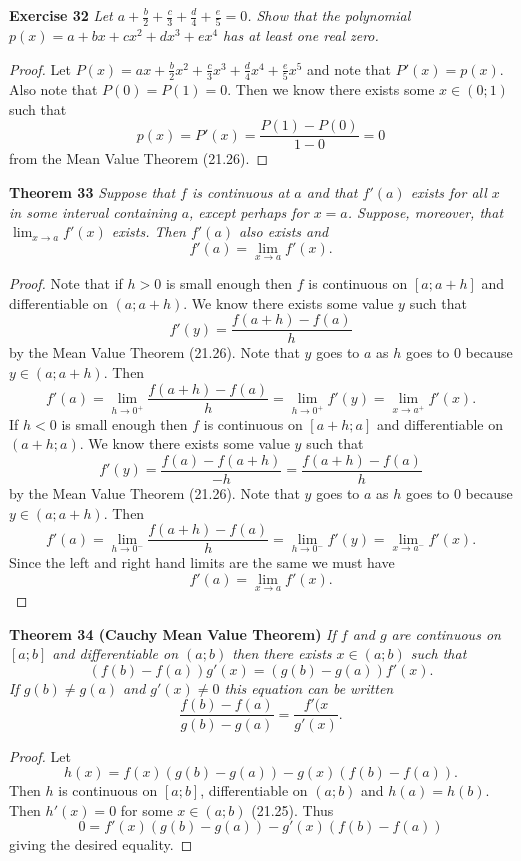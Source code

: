 \documentclass{article}
\begin{document}
\begin{flushleft}
\textbf{Exercise 32}
\textsl{Let $a + \frac{b}{2} + \frac{c}{3} + \frac{d}{4} + \frac{e}{5} = 0$. Show that the polynomial $p(x) = a + bx + cx^2 + dx^3 + ex^4$ has at least one real zero.}
\begin{proof}
Let $P(x) = ax + \frac{b}{2}x^2 + \frac{c}{3}x^3 + \frac{d}{4}x^4 + \frac{e}{5}x^5$ and note that $P'(x) = p(x)$. Also note that $P(0) = P(1) = 0$. Then we know there exists some $x \in (0;1)$ such that
\[
p(x) = P'(x) = \frac{P(1) - P(0)}{1-0} = 0
\]
from the Mean Value Theorem (21.26).
\end{proof}

\textbf{Theorem 33}
\textsl{Suppose that $f$ is continuous at $a$ and that $f'(a)$ exists for all $x$ in some interval containing $a$, except perhaps for $x = a$. Suppose, moreover, that $\lim_{x \rightarrow a} f'(x)$ exists. Then $f'(a)$ also exists and
\[
f'(a) = \lim_{x \rightarrow a} f'(x).
\]}
\begin{proof}
Note that if $h > 0$ is small enough then $f$ is continuous on $[a; a+h]$ and differentiable on $(a;a+h)$. We know there exists some value $y$ such that
\[
f'(y) = \frac{f(a+h) - f(a)}{h}
\]
by the Mean Value Theorem (21.26). Note that $y$ goes to $a$ as $h$ goes to $0$ because $y \in (a; a+h)$. Then
\[
f'(a) = \lim_{h \rightarrow 0^+} \frac{f(a+h) - f(a)}{h} = \lim_{h \rightarrow 0^+} f'(y) = \lim_{x \rightarrow a^+} f'(x).
\]
If $h < 0$ is small enough then $f$ is continuous on $[a+h; a]$ and differentiable on $(a+h;a)$. We know there exists some value $y$ such that
\[
f'(y) = \frac{f(a) - f(a+h)}{-h} = \frac{f(a+h) - f(a)}{h}
\]
by the Mean Value Theorem (21.26). Note that $y$ goes to $a$ as $h$ goes to $0$ because $y \in (a; a+h)$. Then
\[
f'(a) = \lim_{h \rightarrow 0^-} \frac{f(a+h) - f(a)}{h} = \lim_{h \rightarrow 0^-} f'(y) = \lim_{x \rightarrow a^-} f'(x).
\]
Since the left and right hand limits are the same we must have
\[
f'(a) = \lim_{x \rightarrow a} f'(x).
\]
\end{proof}

\textbf{Theorem 34 (Cauchy Mean Value Theorem)}
\textsl{If $f$ and $g$ are continuous on $[a;b]$ and differentiable on $(a;b)$ then there exists $x \in (a;b)$ such that
\[
(f(b) - f(a)) g'(x) = (g(b) - g(a)) f'(x).
\]
If $g(b) \neq g(a)$ and $g'(x) \neq 0$ this equation can be written
\[
\frac{f(b)-f(a)}{g(b)-g(a)} = \frac{f'(x}{g'(x)}.
\]}
\begin{proof}
Let
\[
h(x) = f(x) (g(b)-g(a)) - g(x) (f(b)-f(a)).
\]
Then $h$ is continuous on $[a;b]$, differentiable on $(a;b)$ and $h(a) = h(b)$. Then $h'(x) = 0$ for some $x \in (a;b)$ (21.25). Thus
\[
0 = f'(x) (g(b)-g(a)) - g'(x) (f(b)-f(a))
\]
giving the desired equality.
\end{proof}


\end{flushleft}
\end{document}
